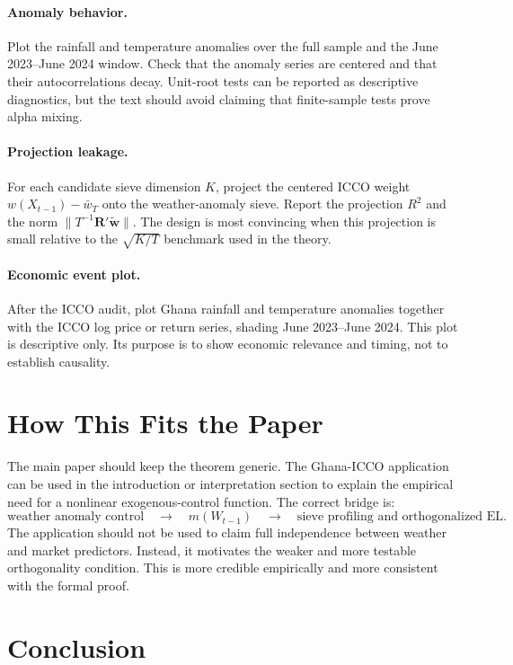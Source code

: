 \documentclass[11pt]{article}
\begin{document}
\paragraph{Anomaly behavior.}
Plot the rainfall and temperature anomalies over the full sample and the June 2023--June 2024 window. Check that the anomaly series are centered and that their autocorrelations decay. Unit-root tests can be reported as descriptive diagnostics, but the text should avoid claiming that finite-sample tests prove alpha mixing.

\paragraph{Projection leakage.}
For each candidate sieve dimension \(K\), project the centered ICCO weight \(w(X_{t-1})-\bar w_T\) onto the weather-anomaly sieve. Report the projection \(R^2\) and the norm \(\|T^{-1}\bm R'\widetilde{\bm w}\|\). The design is most convincing when this projection is small relative to the \(\sqrt{K/T}\) benchmark used in the theory.

\paragraph{Economic event plot.}
After the ICCO audit, plot Ghana rainfall and temperature anomalies together with the ICCO log price or return series, shading June 2023--June 2024. This plot is descriptive only. Its purpose is to show economic relevance and timing, not to establish causality.

\section{How This Fits the Paper}

The main paper should keep the theorem generic. The Ghana-ICCO application can be used in the introduction or interpretation section to explain the empirical need for a nonlinear exogenous-control function. The correct bridge is:
\[
    \text{weather anomaly control}
    \quad\longrightarrow\quad
    m(W_{t-1})
    \quad\longrightarrow\quad
    \text{sieve profiling and orthogonalized EL}.
\]
The application should not be used to claim full independence between weather and market predictors. Instead, it motivates the weaker and more testable orthogonality condition. This is more credible empirically and more consistent with the formal proof.

\section{Conclusion}
\end{document}
